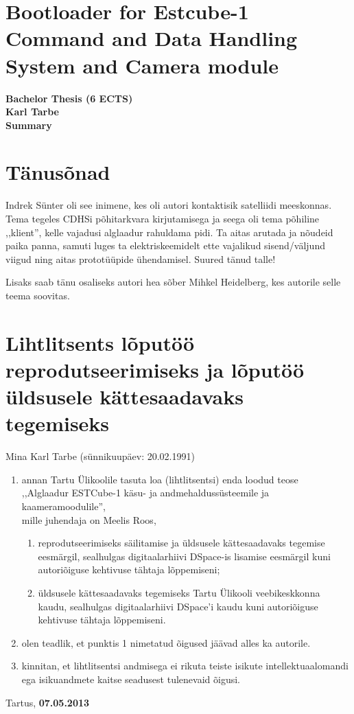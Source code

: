\documentclass[12pt,a4paper]{article}
\begin{document}
\section*{Bootloader for Estcube-1 Command and Data Handling System and Camera module}
\begin{center}
\bf Bachelor Thesis (6 ECTS)\\
Karl Tarbe\\
Summary
\end{center}

\section*{Tänusõnad}
Indrek Sünter oli see inimene, kes oli autori kontaktisik satelliidi meeskonnas.
Tema tegeles CDHSi põhitarkvara kirjutamisega ja seega oli tema põhiline
,,klient'', kelle vajadusi alglaadur rahuldama pidi. Ta aitas arutada ja nõudeid
paika panna, samuti luges ta elektriskeemidelt ette vajalikud sisend/väljund
viigud ning aitas prototüüpide ühendamisel. Suured tänud talle!

Lisaks saab tänu osaliseks autori hea sõber Mihkel Heidelberg, kes autorile selle
teema soovitas.

\label{viited}



\pagebreak
\section*{Lihtlitsents lõputöö reprodutseerimiseks ja lõputöö üldsusele
kättesaadavaks tegemiseks}

Mina Karl Tarbe (sünnikuupäev: 20.02.1991)
\begin{enumerate}
	\item
		annan Tartu Ülikoolile tasuta loa (lihtlitsentsi) enda loodud teose\\
		,,Alglaadur ESTCube-1 käsu- ja andmehaldussüsteemile ja
		kaameramoodulile'',\\
		mille juhendaja on Meelis Roos,
		\begin{enumerate}
			\item 
				reprodutseerimiseks säilitamise ja üldsusele kättesaadavaks
				tegemise eesmärgil, sealhulgas digitaalarhiivi DSpace-is
				lisamise eesmärgil kuni autoriõiguse kehtivuse tähtaja
				lõppemiseni;
			\item
				üldsusele kättesaadavaks tegemiseks Tartu Ülikooli
				veebikeskkonna kaudu, sealhulgas digitaalarhiivi DSpace'i kaudu
				kuni autoriõiguse kehtivuse tähtaja lõppemiseni.
		\end{enumerate}
	\item
		olen teadlik, et punktis 1 nimetatud õigused jäävad alles ka autorile.
	\item
		kinnitan, et lihtlitsentsi andmisega ei rikuta teiste isikute
		intellektuaalomandi ega isikuandmete kaitse seadusest tulenevaid õigusi.
\end{enumerate}

Tartus, \textbf{07.05.2013}
\end{document}
